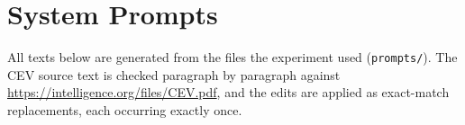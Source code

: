 \section{System Prompts}
\label{app:prompts}
All texts below are generated from the files the experiment used (\texttt{prompts/}). The CEV source text is checked
paragraph by paragraph against \url{https://intelligence.org/files/CEV.pdf}, and the edits are applied as exact-match
replacements, each occurring exactly once.


